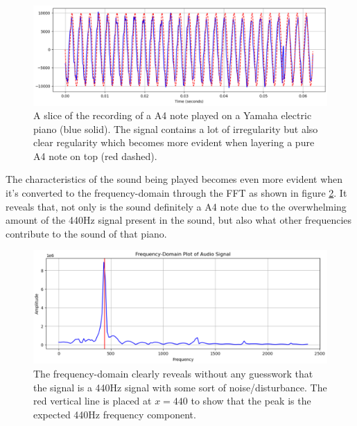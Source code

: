 \begin{figure}[ht]
    \centering
    \includegraphics[width=\textwidth]{./images/piano_wave.png}
    \caption{A slice of the recording of a A4 note played on a Yamaha electric piano (blue solid). The signal contains a lot of irregularity but also clear regularity which becomes more evident when layering a pure A4 note on top (red dashed).\label{fig:pianoWave}}
\end{figure}

The characteristics of the sound being played becomes even more evident when it's converted to the frequency-domain through the FFT as shown in figure \ref{fig:pianoFreq}. It reveals that, not only is the sound definitely a A4 note due to the overwhelming amount of the 440Hz signal present in the sound, but also what other frequencies contribute to the sound of that piano.

\begin{figure}[ht]
    \centering
    \includegraphics[width=\textwidth]{./images/piano_freq.png}
    \caption{The frequency-domain clearly reveals without any guesswork that the signal is a 440Hz signal with some sort of noise/disturbance. The red vertical line is placed at $x=440$ to show that the peak is the expected 440Hz frequency component.\label{fig:pianoFreq}}
\end{figure}

